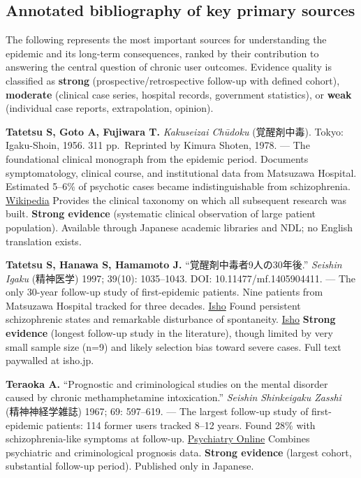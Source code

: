 \subsection{Annotated bibliography of key primary sources}\label{12_philopon-annotated-bibliography-of-key-primary-sources}

The following represents the most important sources for understanding the epidemic and its long-term consequences, ranked by their contribution to answering the central question of chronic user outcomes. Evidence quality is classified as \textbf{strong} (prospective/retrospective follow-up with defined cohort), \textbf{moderate} (clinical case series, hospital records, government statistics), or \textbf{weak} (individual case reports, extrapolation, opinion).

\textbf{Tatetsu S, Goto A, Fujiwara T.} \emph{Kakuseizai Chūdoku} (覚醒剤中毒). Tokyo: Igaku-Shoin, 1956. 311 pp.~Reprinted by Kimura Shoten, 1978. --- The foundational clinical monograph from the epidemic period. Documents symptomatology, clinical course, and institutional data from Matsuzawa Hospital. Estimated 5--6\% of psychotic cases became indistinguishable from schizophrenia. \href{https://ja.wikipedia.org/wiki/\%E7\%B2\%BE\%E7\%A5\%9E\%E5\%88\%BA\%E6\%BF\%80\%E8\%96\%AC\%E7\%B2\%BE\%E7\%A5\%9E\%E7\%97\%85}{Wikipedia} Provides the clinical taxonomy on which all subsequent research was built. \textbf{Strong evidence} (systematic clinical observation of large patient population). Available through Japanese academic libraries and NDL; no English translation exists.

\textbf{Tatetsu S, Hanawa S, Hamamoto J.} ``覚醒剤中毒者9人の30年後.'' \emph{Seishin Igaku} (精神医学) 1997; 39(10): 1035--1043. DOI: 10.11477/mf.1405904411. --- The only 30-year follow-up study of first-epidemic patients. Nine patients from Matsuzawa Hospital tracked for three decades. \href{https://webview.isho.jp/journal/detail/abs/10.11477/mf.1405904147}{Isho} Found persistent schizophrenic states and remarkable disturbance of spontaneity. \href{https://webview.isho.jp/journal/detail/abs/10.11477/mf.1405904411}{Isho} \textbf{Strong evidence} (longest follow-up study in the literature), though limited by very small sample size (n=9) and likely selection bias toward severe cases. Full text paywalled at isho.jp.

\textbf{Teraoka A.} ``Prognostic and criminological studies on the mental disorder caused by chronic methamphetamine intoxication.'' \emph{Seishin Shinkeigaku Zasshi} (精神神経学雑誌) 1967; 69: 597--619. --- The largest follow-up study of first-epidemic patients: 114 former users tracked 8--12 years. Found 28\% with schizophrenia-like symptoms at follow-up. \href{https://psychiatryonline.org/doi/10.1176/appi.ajp.2009.08111695}{Psychiatry Online} Combines psychiatric and criminological prognosis data. \textbf{Strong evidence} (largest cohort, substantial follow-up period). Published only in Japanese.

